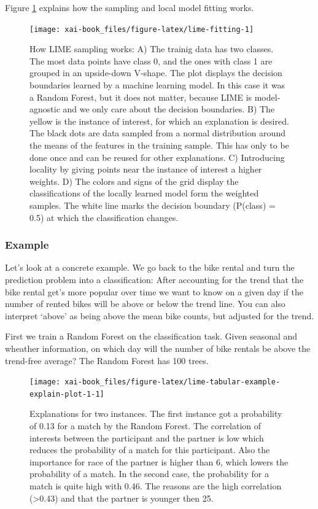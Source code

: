 \documentclass[12pt,]{krantz}
\theoremstyle{definition}
\theoremstyle{definition}
\theoremstyle{definition}
\theoremstyle{remark}
\begin{document}
Figure \ref{fig:lime-fitting} explains how the sampling and local model
fitting works.

\begin{figure}

{\centering \texttt{[image: xai-book\_files/figure-latex/lime-fitting-1]} 

}

\caption{How LIME sampling works: A) The trainig data has two classes. The most data points have class 0, and the ones with class 1 are grouped in an upside-down V-shape. The plot displays the decision boundaries learned by a machine learning model. In this case it was a Random Forest, but it does not matter, because LIME is model-agnostic and we only care about the decision boundaries. B) The yellow is the instance of interest, for which an explanation is desired. The black dots are data sampled from a normal distribution around the means of the features in the training sample. This has only to be done once and can be reused for other explanations. C) Introducing locality by giving points near the instance of interest a higher weights. D) The colors and signs of the grid display the classifications of the locally learned model form the weighted samples. The white line marks the decision boundary (P(class) = 0.5) at which the classification changes.}\label{fig:lime-fitting}
\end{figure}

\subsubsection{Example}\label{example-3}

Let's look at a concrete example. We go back to the bike rental and turn
the prediction problem into a classification: After accounting for the
trend that the bike rental get's more popular over time we want to know
on a given day if the number of rented bikes will be above or below the
trend line. You can also interpret `above' as being above the mean bike
counts, but adjusted for the trend.

First we train a Random Forest on the classification task. Given
seasonal and wheather information, on which day will the number of bike
rentals be above the trend-free average? The Random Forest has 100
trees.

\begin{figure}

{\centering \texttt{[image: xai-book\_files/figure-latex/lime-tabular-example-explain-plot-1-1]} 

}

\caption{Explanations for two instances. The first instance got a probability of 0.13 for a match by the Random Forest. The correlation of interests between the participant and the partner is low which reduces the probability of a match for this participant. Also the importance for race of the partner is higher than 6, which lowers the probability of a match.  In the second case, the probability for a match is quite high with 0.46. The reasons are the high correlation (>0.43) and that the partner is younger then 25.}\label{fig:lime-tabular-example-explain-plot-1}
\end{figure}
\end{document}

